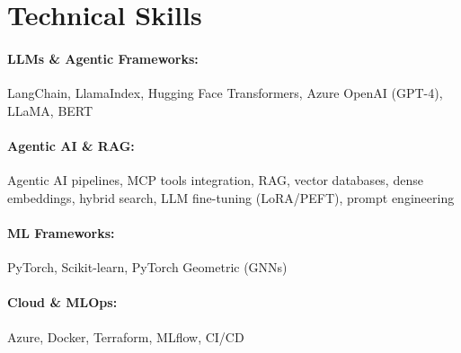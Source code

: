 \documentclass[10pt, letterpaper]{article}
\newenvironment{onecolentry}{
    \begin{adjustwidth}{
        0 cm + 0.00001 cm
    }{
        0 cm + 0.00001 cm
    }
}{
    \end{adjustwidth}
} %
\begin{document}
        




\vspace{-1mm}
\section{Technical Skills}

        \paragraph{LLMs \& Agentic Frameworks:} LangChain, LlamaIndex, Hugging Face Transformers, Azure OpenAI (GPT-4), LLaMA, BERT
        \vspace{-4mm}
        \paragraph{Agentic AI \& RAG:} Agentic AI pipelines, MCP tools integration, RAG, vector databases, dense embeddings, hybrid search, LLM fine-tuning (LoRA/PEFT), prompt engineering
        \vspace{-4mm}
        \paragraph{ML Frameworks:} PyTorch, Scikit-learn, PyTorch Geometric (GNNs)
        \vspace{-4mm}
        \paragraph{Cloud \& MLOps:} Azure, Docker, Terraform, MLflow, CI/CD
        \vspace{-4mm}
\end{document}
